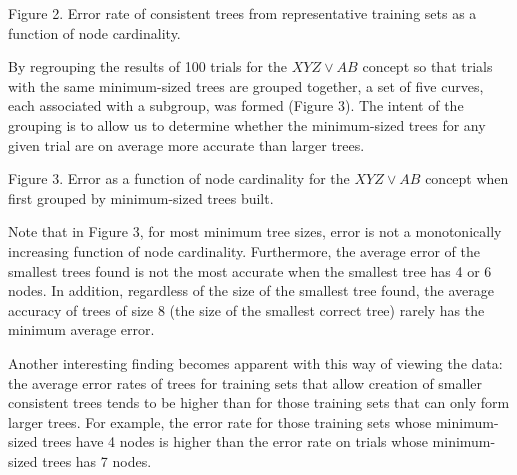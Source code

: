 \vspace*{0.3cm}
\hspace{0.6cm}
\centerline{}

\vspace{0.2cm}
\parindent 0.0cm
Figure 2. Error rate of consistent trees from representative training
sets as a function of node cardinality.\\
\parindent 0.6cm
\parskip 0.0cm

By regrouping the results of 100 trials for the $XYZ \vee AB$ concept
so that trials with the same minimum-sized trees are grouped together,
a set of five curves, each associated with a subgroup, was formed
(Figure 3).  The intent of the grouping is to allow us
to determine whether the minimum-sized trees for any given trial are on
average more accurate than larger trees.

\vspace*{0.3cm}
\hspace{0.0cm}
\centerline{}

\vspace{0.2cm}
\parindent 0.0cm
Figure 3. Error as a function of node cardinality for the 
$XYZ \vee AB$ concept when first grouped by minimum-sized trees built.\\
\parindent 0.6cm
\parskip 0.0cm

Note that in Figure 3, for most minimum tree sizes, error is not a
monotonically increasing function of node cardinality.  Furthermore,
the average error of the smallest trees found is not the most accurate
when the smallest tree has 4 or 6 nodes.  In addition, regardless of
the size of the smallest tree found, the average accuracy of trees of
size 8 (the size of the smallest correct tree) rarely has the minimum
average error.

Another interesting finding becomes apparent with this way of viewing
the data: the average error rates of trees for training sets that
allow creation of smaller consistent trees tends to be higher than for
those training sets that can only form larger trees.  For example, the
error rate for those training sets whose minimum-sized trees have 4
nodes is higher than the error rate on trials whose minimum-sized trees
has 7 nodes.

\vspace*{0.3cm}
\hspace{0.6cm}
\centerline{}

